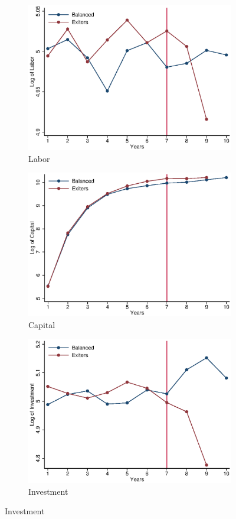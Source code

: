 \documentclass[11pt]{article}
\begin{document}
\begin{figure}[ht]
\begin{subfigure}[b]{.23\textwidth}
	\end{subfigure}
	\begin{subfigure}[b]{.23\textwidth}
		\centering
		\caption{Labor}
		\includegraphics[width=\textwidth]{timeL.eps}
	\end{subfigure}
	\begin{subfigure}[b]{.23\textwidth}
		\centering
		\caption{Capital}
		\includegraphics[width=\textwidth]{timeK.eps}
	\end{subfigure}
	\begin{subfigure}[b]{.23\textwidth}
		\centering
		\caption{Investment}
		\includegraphics[width=\textwidth]{timeI.eps}

\end{subfigure}
\end{figure}
\end{document}
